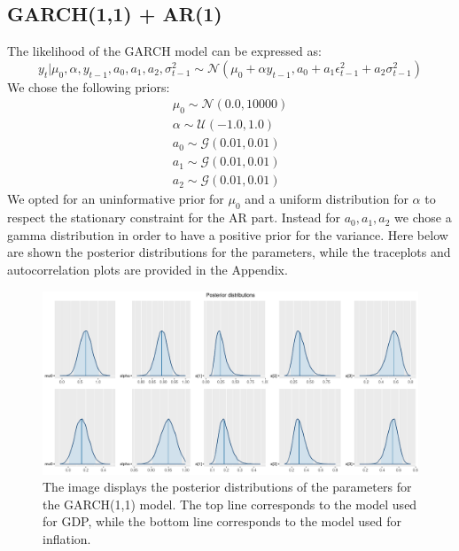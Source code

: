 \subsection*{GARCH(1,1) + AR(1)}
The likelihood of the GARCH model can be expressed as:
\begin{equation}
    y_{t}|\mu_{0},\alpha,y_{t-1},a_0,a_1,a_2,\sigma^2_{t-1}\sim \mathcal{N}(\mu_{0} + \alpha y_{t-1}, a_0 + a_1 \epsilon^2_{t-1} + a_2 \sigma^2_{t-1})
\end{equation}
We chose the following priors:
\begin{equation}
    \begin{split}
        \mu_0 \sim \mathcal{N}(0.0, 10000) \\
        \alpha \sim \mathcal{U}(-1.0, 1.0) \\
        a_0 \sim \mathcal{G}(0.01, 0.01) \\
        a_1 \sim \mathcal{G}(0.01, 0.01) \\
        a_2 \sim \mathcal{G}(0.01, 0.01)
    \end{split}
\end{equation}
We opted for an uninformative prior for $\mu_{0}$ and a uniform distribution for $\alpha$ to respect the stationary constraint for the AR part. Instead for $a_0, a_1, a_2$ we chose a gamma distribution in order to have a positive prior for the variance.
Here below are shown the posterior distributions for the parameters, while the traceplots and autocorrelation plots are provided in the Appendix.
\begin{figure}[H]
    \centering
    \includegraphics[width=\textwidth]{images/5-GARCH/posteriors.png}
    \caption{The image displays the posterior distributions of the parameters for the GARCH(1,1) model. The top line corresponds to the model used for GDP, while the bottom line corresponds to the model used for inflation.}
    \label{fig:GARCH_posteriors}
\end{figure}

